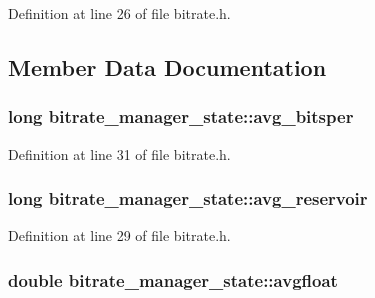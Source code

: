 Definition at line 26 of file bitrate.\+h.



\subsection{Member Data Documentation}
\subsubsection[{\texorpdfstring{avg\+\_\+bitsper}{avg_bitsper}}]{\setlength{\rightskip}{0pt plus 5cm}long bitrate\+\_\+manager\+\_\+state\+::avg\+\_\+bitsper}\hypertarget{structbitrate__manager__state_a39abde2acedad23996b933837a0b72be}{}\label{structbitrate__manager__state_a39abde2acedad23996b933837a0b72be}


Definition at line 31 of file bitrate.\+h.

\subsubsection[{\texorpdfstring{avg\+\_\+reservoir}{avg_reservoir}}]{\setlength{\rightskip}{0pt plus 5cm}long bitrate\+\_\+manager\+\_\+state\+::avg\+\_\+reservoir}\hypertarget{structbitrate__manager__state_a6fc0ce1557ae9808b2390271008bce0e}{}\label{structbitrate__manager__state_a6fc0ce1557ae9808b2390271008bce0e}


Definition at line 29 of file bitrate.\+h.

\subsubsection[{\texorpdfstring{avgfloat}{avgfloat}}]{\setlength{\rightskip}{0pt plus 5cm}double bitrate\+\_\+manager\+\_\+state\+::avgfloat}\hypertarget{structbitrate__manager__state_a97494b734f47a814b535cd8f07203a03}{}\label{structbitrate__manager__state_a97494b734f47a814b535cd8f07203a03}


